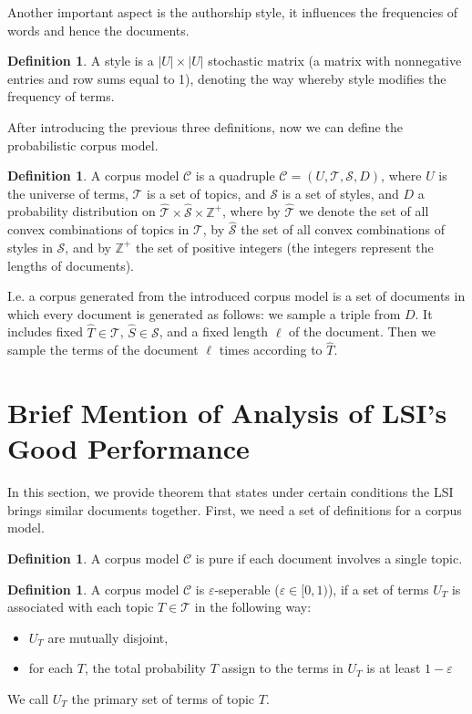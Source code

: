 \documentclass[a4paper,11pt,DIV=15]{scrartcl} %
\renewcommand{\epsilon}{\varepsilon}
\theoremstyle{plain}
\theoremstyle{definition}
\newtheorem{definition}[theorem]{Definition}
\begin{document}
Another important aspect is the authorship style, it influences the frequencies of words and hence the documents. 
\begin{definition}
    A style is a $|U| \times|U|$ stochastic matrix (a matrix with nonnegative entries and row sums equal to 1), denoting the way whereby style modifies
the frequency of terms.
\end{definition}

After introducing the previous three definitions, now we can define the probabilistic corpus model.
\begin{definition}
     A corpus model $\mathscr{C}$ is a quadruple $\mathscr{C} = (U,\mathscr{T}, \mathscr{S}, D)$, where $U$ is
the universe of terms, $\mathscr{T}$ is a set of topics, and $\mathscr{S}$ is a set of styles, and $D$ a probability distribution on $\hat{\mathscr{T}} \times \hat{\mathscr{S}} \times \mathbb{Z}^+$, where by $\hat{\mathscr{T}}$ we denote the set of all convex combinations of topics in $\mathscr{T}$, by $\hat{\mathscr{S}}$ the set of all convex combinations of styles in $\mathscr{S}$, and by 
$\mathbb{Z}^+$ the set of positive integers (the integers represent the lengths of documents).
\end{definition}
I.e. a corpus generated from the introduced corpus model is a set of documents in which every document is generated as follows: we sample a triple from $D$. It includes fixed $\hat{T} \in \mathscr{T}$, $\hat{S} \in \mathscr{S}$, and a fixed length $\ell$ of the document. Then we sample the terms of the document $\ell$ times according to $\hat{T}$.


\section{Brief Mention of Analysis of LSI's Good Performance} %
In this section, we provide theorem that states under certain conditions the LSI brings similar documents together.
First, we need a set of definitions for a corpus model.
\begin{definition}
  A corpus model $\mathscr{C}$ is pure if each document involves a single topic.
\end{definition}

\begin{definition}
  A corpus model $\mathscr{C}$ is $\epsilon$-seperable ($\epsilon \in [0,1)$), if a set of terms $U_T$ is associated with each topic $T \in \mathscr{T}$ in the following way:
\begin{itemize}
    \item $U_T$ are mutually disjoint,
    \item for each $T$, the total probability $T$ assign to the terms in $U_T$  is at least $1-\epsilon$
\end{itemize}
We call $U_T$ the primary set of terms of topic $T$.
\end{definition}
\end{document}
